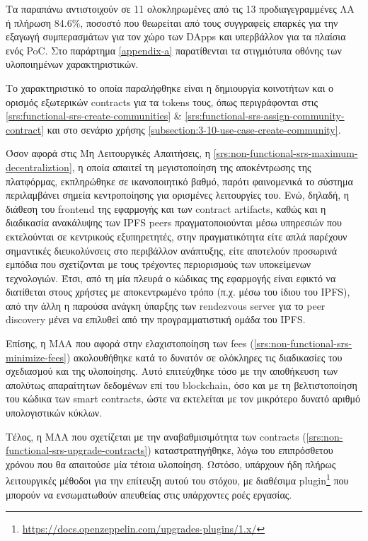 Τα παραπάνω αντιστοιχούν σε 11 ολοκληρωμένες από τις 13 προδιαγεγραμμένες ΛΑ ή πλήρωση 84.6\%, ποσοστό που θεωρείται από τους συγγραφείς επαρκές για την εξαγωγή συμπερασμάτων για τον χώρο των DApps και υπερβάλλον για τα πλαίσια ενός PoC. Στο παράρτημα \ref{appendix-a} παρατίθενται τα στιγμιότυπα οθόνης των υλοποιημένων χαρακτηριστικών.

Το χαρακτηριστικό το οποία παραλήφθηκε είναι η δημιουργία κοινοτήτων και ο ορισμός εξωτερικών contracts για τα tokens τους, όπως περιγράφονται στις \ref{srs:functional-srs-create-communities} \& \ref{srs:functional-srs-assign-community-contract} και στο σενάριο χρήσης \ref{subsection:3-10-use-case-create-community}.

Όσον αφορά στις Μη Λειτουργικές Απαιτήσεις, η \ref{srs:non-functional-srs-maximum-decentraliztion}, η οποία απαιτεί τη μεγιστοποίηση της αποκέντρωσης της πλατφόρμας, εκπληρώθηκε σε ικανοποιητικό βαθμό, παρότι φαινομενικά το σύστημα περιλαμβάνει σημεία κεντροποίησης για ορισμένες λειτουργίες του. Ενώ, δηλαδή, η διάθεση του frontend της εφαρμογής και των contract artifacts, καθώς και η διαδικασία ανακάλυψης των IPFS peers πραγματοποιούνται μέσω υπηρεσιών που εκτελούνται σε κεντρικούς εξυπηρετητές, στην πραγματικότητα είτε απλά παρέχουν σημαντικές διευκολύνσεις στο περιβάλλον ανάπτυξης, είτε αποτελούν προσωρινά εμπόδια που σχετίζονται με τους τρέχοντες περιορισμούς των υποκείμενων τεχνολογιών. Έτσι, από τη μία πλευρά ο κώδικας της εφαρμογής είναι εφικτό να διατίθεται στους χρήστες με αποκεντρωμένο τρόπο (π.χ. μέσω του ίδιου του IPFS), από την άλλη η παρούσα ανάγκη ύπαρξης των rendezvous server για το peer discovery μένει να επιλυθεί από την προγραμματιστική ομάδα του IPFS.

Επίσης, η ΜΛΑ που αφορά στην ελαχιστοποίηση των fees (\ref{srs:non-functional-srs-minimize-fees}) ακολουθήθηκε κατά το δυνατόν σε ολόκληρες τις διαδικασίες του σχεδιασμού και της υλοποίησης. Αυτό επιτεύχθηκε τόσο με την αποθήκευση των απολύτως απαραίτητων δεδομένων επί του blockchain, όσο και με τη βελτιστοποίηση του κώδικα των smart contracts, ώστε να εκτελείται με τον μικρότερο δυνατό αριθμό υπολογιστικών κύκλων.

Τέλος, η ΜΛΑ που σχετίζεται με την αναβαθμισιμότητα των contracts (\ref{srs:non-functional-srs-upgrade-contracts}) καταστρατηγήθηκε, λόγω του επιπρόσθετου χρόνου που θα απαιτούσε μία τέτοια υλοποίηση. Ωστόσο, υπάρχουν ήδη πλήρως λειτουργικές μέθοδοι για την επίτευξη αυτού του στόχου, με διαθέσιμα plugin\footnote{\url{https://docs.openzeppelin.com/upgrades-plugins/1.x/}} που μπορούν να ενσωματωθούν απευθείας στις υπάρχοντες ροές εργασίας.

